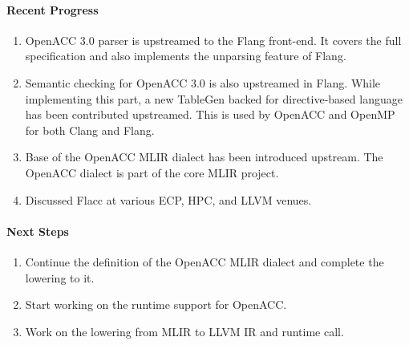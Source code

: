 \paragraph{Recent Progress}

\begin{enumerate}
\item OpenACC 3.0 parser is upstreamed to the Flang front-end. It covers the
      full specification and also implements the unparsing feature of Flang.
\item Semantic checking for OpenACC 3.0 is also upstreamed in Flang. While
      implementing this part, a new TableGen backed for directive-based language
      has been contributed upstreamed. This is used by OpenACC and OpenMP for
      both Clang and Flang.
\item Base of the OpenACC MLIR dialect has been introduced upstream. The OpenACC
      dialect is part of the core MLIR project.
\item Discussed Flacc at various ECP, HPC, and LLVM venues.
\end{enumerate}


\paragraph{Next Steps}

\begin{enumerate}
\item Continue the definition of the OpenACC MLIR dialect and complete the
      lowering to it.
\item Start working on the runtime support for OpenACC.
\item Work on the lowering from MLIR to LLVM IR and runtime call.
\end{enumerate}
